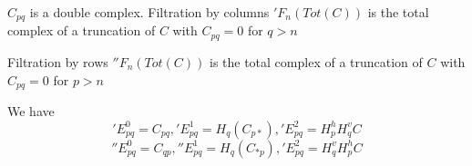 \documentclass[../main.tex]{subfiles}
\begin{document}
\begin{definition}
$C_{pq}$ is a double complex. Filtration by columns $'F_n(Tot(C))$ is the total complex of a truncation of $C$ with $C_{pq}=0$ for $q>n$
\begin{center}
\end{center}
Filtration by rows $''F_n(Tot(C))$ is the total complex of a truncation of $C$ with $C_{pq}=0$ for $p>n$
\begin{center}
\end{center}
We have
\['E^0_{pq}=C_{pq}, 'E^1_{pq}=H_q(C_{p*}), 'E^2_{pq}=H^h_pH^v_qC\]
\[''E^0_{pq}=C_{qp}, ''E^1_{pq}=H_q(C_{*p}), 'E^2_{pq}=H^v_qH^h_pC\]
\end{definition}
\end{document}
